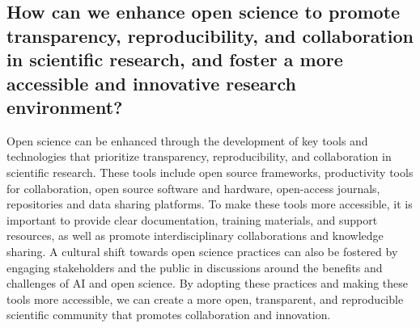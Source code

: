 
\subsection{How can we enhance open science to promote transparency, reproducibility, and collaboration in scientific research, and foster a more accessible and innovative research environment?}

Open science can be enhanced through the development of key tools and technologies that prioritize transparency, reproducibility, and collaboration in scientific research. These tools include open source frameworks, productivity tools for collaboration, open source software and hardware, open-access journals, repositories and data sharing platforms. To make these tools more accessible, it is important to provide clear documentation, training materials, and support resources, as well as promote interdisciplinary collaborations and knowledge sharing. A cultural shift towards open science practices can also be fostered by engaging stakeholders and the public in discussions around the benefits and challenges of AI and open science. By adopting these practices and making these tools more accessible, we can create a more open, transparent, and reproducible scientific community that promotes collaboration and innovation.

